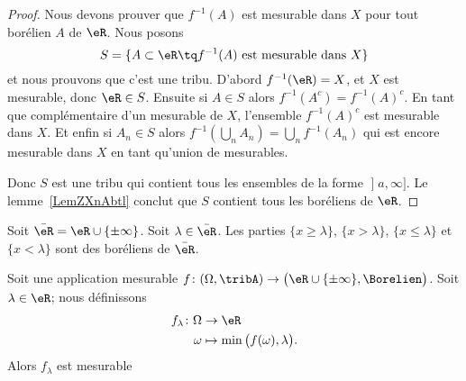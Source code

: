 \begin{proof}
	Nous devons prouver que \( f^{-1}(A)\) est mesurable dans \( X\) pour tout borélien \( A\) de \( \eR\). Nous posons
	\begin{equation}
		S=\{ A\subset \eR\tq f^{-1}(A)\text{ est mesurable dans } X \}
	\end{equation}
	et nous prouvons que c'est une tribu. D'abord \( f^{-1}(\eR)=X\), et \( X\) est mesurable, donc \( \eR\in S\). Ensuite si \( A\in S\) alors \( f^{-1}(A^c)=f^{-1}(A)^c\). En tant que complémentaire d'un mesurable de \( X\), l'ensemble \( f^{-1}(A)^c\) est mesurable dans \( X\). Et enfin si \( A_n\in S \) alors \( f^{-1}(\bigcup_nA_n)=\bigcup_nf^{-1}(A_n)\) qui est encore mesurable dans \( X\) en tant qu'union de mesurables.

	Donc \( S\) est une tribu qui contient tous les ensembles de la forme \( \mathopen] a , \infty \mathclose]\). Le lemme~\ref{LemZXnAbtl} conclut que \( S\) contient tous les boréliens de \( \eR\).
\end{proof}

\begin{lemma}       \label{LEMooMYUFooKqdDNc}
	Soit \( \bar \eR=\eR\cup\{ \pm\infty \}\). Soit \( \lambda\in\bar \eR\).  Les parties \( \{ x\geq\lambda \}\), \( \{ x>\lambda \}\), \( \{ x\leq \lambda \}\) et \( \{ x<\lambda \}\) sont des boréliens de \( \bar\eR\).
\end{lemma}

\begin{lemma}       \label{LEMooAITEooMjHxvh}
	Soit une application mesurable \( f\colon (\Omega,\tribA)\to \big( \eR\cup\{ \pm\infty \},\Borelien \big)\). Soit \( \lambda\in \eR\); nous définissons
	\begin{equation}
		\begin{aligned}
			f_{\lambda}\colon \Omega & \to \eR                                    \\
			\omega                   & \mapsto \min\big( f(\omega),\lambda \big).
		\end{aligned}
	\end{equation}
	Alors \( f_{\lambda}\) est mesurable
\end{lemma}

